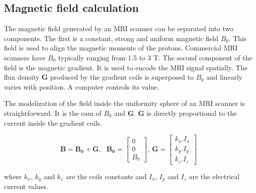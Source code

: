 \documentclass[letterpaper, 10 pt, conference]{ieeeconf}  %
\begin{document}
\subsection{Magnetic field calculation}
\label{magfield}
The magnetic field generated by an MRI scanner can be separated into two components. The first is a constant, strong and uniform magnetic field $B_0$. This field is used to align the magnetic moments of the protons. Commercial MRI scanners have $B_0$ typically ranging from 1.5 to 3 T. The second component of the field is the magnetic gradient. It is used to encode the MRI signal spatially. The flux density $\mathbf{G}$ produced by the gradient coils is superposed to $B_0$ and linearly varies with position. A computer controls its value.\par
The modelization of the field inside the uniformity sphere of an MRI scanner is straightforward. It is the sum of $B_0$ and $\mathbf{G}$. $\mathbf{G}$ is directly proportional to the current inside the gradient coils. 

\begin{equation}
\mathbf{B}=\mathbf{B_0}+\mathbf{G},~~~
\mathbf{B_0}=\begin{bmatrix}
0\\ 
0\\ 
B_0
\end{bmatrix},~
\mathbf{G}=\begin{bmatrix}
k_x.I_x\\ 
k_y.I_y\\ 
k_z.I_z
\end{bmatrix}
\label{magfield}
\end{equation}

where $k_x$, $k_y$ and $k_z$ are the coils constants and $I_x$, $I_y$ and $I_z$ are the electrical current values.\par
\end{document}
